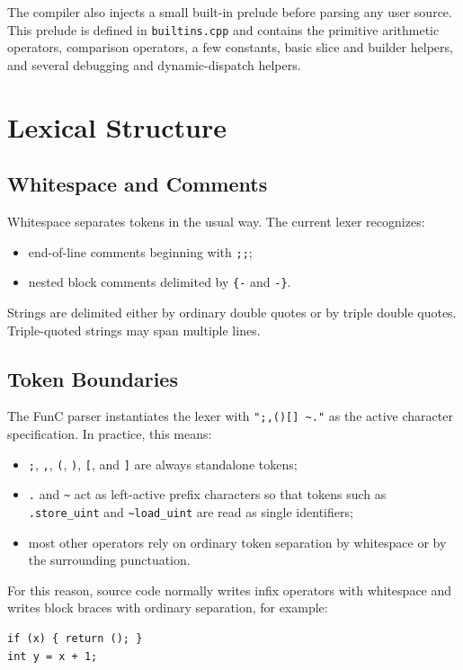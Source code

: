\documentclass[12pt,oneside]{article}
\begin{document}
The compiler also injects a small built-in prelude before parsing any user
source. This prelude is defined in \verb|builtins.cpp| and contains the
primitive arithmetic operators, comparison operators, a few constants, basic
slice and builder helpers, and several debugging and dynamic-dispatch helpers.

\section{Lexical Structure}
\subsection{Whitespace and Comments}
Whitespace separates tokens in the usual way. The current lexer recognizes:

\begin{itemize}
\item end-of-line comments beginning with \verb|;;|;
\item nested block comments delimited by \verb|{-| and \verb|-}|.
\end{itemize}

Strings are delimited either by ordinary double quotes or by triple double
quotes. Triple-quoted strings may span multiple lines.

\subsection{Token Boundaries}
The FunC parser instantiates the lexer with \verb|";,()[] ~."| as the active
character specification. In practice, this means:

\begin{itemize}
\item \verb|;|, \verb|,|, \verb|(|, \verb|)|, \verb|[|, and \verb|]| are always
standalone tokens;
\item \verb|.| and \verb|~| act as left-active prefix characters so that tokens
such as \verb|.store_uint| and \verb|~load_uint| are read as single identifiers;
\item most other operators rely on ordinary token separation by whitespace or by
the surrounding punctuation.
\end{itemize}

For this reason, source code normally writes infix operators with whitespace and
writes block braces with ordinary separation, for example:

\begin{verbatim}
if (x) { return (); }
int y = x + 1;
\end{verbatim}
\end{document}
